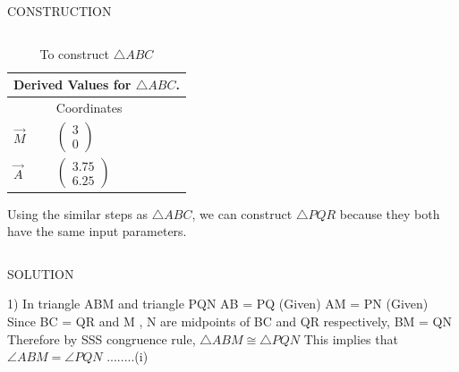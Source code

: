 \documentclass[11pt]{beamer}
\begin{document}
\begin{frame}{CONSTRUCTION}
\begin{columns}
\begin{column}{0.5\textwidth}
\begin{table}[H]
\centering
\resizebox{0.5\textwidth}{!}
{\begin{minipage}{\textwidth}
\begin{tabular}{ |p{1cm}|p{2cm}|  }
\hline
 \multicolumn{2}{|c|}{Derived Values for $\triangle ABC$.} \\
\hline
 & Coordinates \\				
\hline
$\vec{M}$ & $\begin{pmatrix}3\\0\end{pmatrix}$\\				
\hline
$\vec{A}$ & $\begin{pmatrix}3.75\\6.25\end{pmatrix} $\\
\hline
\end{tabular}
\end{minipage}}
\caption{\tiny To construct $\triangle ABC$}
\end{table}
Using the similar steps as $\triangle ABC$, we can construct $\triangle PQR$ because they both have the same input parameters.
\end{column}
\end{columns}

\end{frame}





\begin{frame}{SOLUTION}
    \begin{flushleft}
       
        1) In triangle ABM and triangle PQN
        \newline
        \newline
        AB = PQ  (Given)
        \newline
        AM = PN  (Given)
        \newline
        Since BC = QR and M , N are midpoints of BC and QR respectively, 
        \newline
        BM = QN 
        \newline 
        Therefore by SSS congruence rule, $\triangle  ABM  \cong   \triangle  PQN$ 
        \newline
        \newline
        This implies that $\angle ABM = \angle PQN$    ........(i)

    \end{flushleft}
 

\end{frame}
\end{document}
